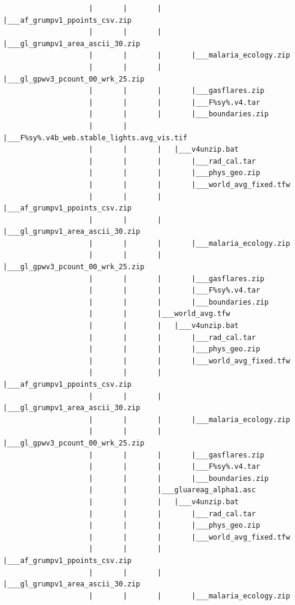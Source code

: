 \documentclass[
]{book}
\begin{document}
\begin{verbatim}
                    |       |       |       |___af_grumpv1_ppoints_csv.zip
                    |       |       |       |___gl_grumpv1_area_ascii_30.zip
                    |       |       |       |___malaria_ecology.zip
                    |       |       |       |___gl_gpwv3_pcount_00_wrk_25.zip
                    |       |       |       |___gasflares.zip
                    |       |       |       |___F%sy%.v4.tar
                    |       |       |       |___boundaries.zip
                    |       |       |___F%sy%.v4b_web.stable_lights.avg_vis.tif
                    |       |       |   |___v4unzip.bat
                    |       |       |       |___rad_cal.tar
                    |       |       |       |___phys_geo.zip
                    |       |       |       |___world_avg_fixed.tfw
                    |       |       |       |___af_grumpv1_ppoints_csv.zip
                    |       |       |       |___gl_grumpv1_area_ascii_30.zip
                    |       |       |       |___malaria_ecology.zip
                    |       |       |       |___gl_gpwv3_pcount_00_wrk_25.zip
                    |       |       |       |___gasflares.zip
                    |       |       |       |___F%sy%.v4.tar
                    |       |       |       |___boundaries.zip
                    |       |       |___world_avg.tfw
                    |       |       |   |___v4unzip.bat
                    |       |       |       |___rad_cal.tar
                    |       |       |       |___phys_geo.zip
                    |       |       |       |___world_avg_fixed.tfw
                    |       |       |       |___af_grumpv1_ppoints_csv.zip
                    |       |       |       |___gl_grumpv1_area_ascii_30.zip
                    |       |       |       |___malaria_ecology.zip
                    |       |       |       |___gl_gpwv3_pcount_00_wrk_25.zip
                    |       |       |       |___gasflares.zip
                    |       |       |       |___F%sy%.v4.tar
                    |       |       |       |___boundaries.zip
                    |       |       |___gluareag_alpha1.asc
                    |       |       |   |___v4unzip.bat
                    |       |       |       |___rad_cal.tar
                    |       |       |       |___phys_geo.zip
                    |       |       |       |___world_avg_fixed.tfw
                    |       |       |       |___af_grumpv1_ppoints_csv.zip
                    |       |       |       |___gl_grumpv1_area_ascii_30.zip
                    |       |       |       |___malaria_ecology.zip

\end{verbatim}
\end{document}
